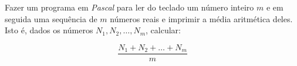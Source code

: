 \item Fazer um programa em \emph{Pascal} para ler do teclado
um número inteiro $m$ e em seguida
uma sequência de $m$ números reais e imprimir a média aritmética deles.
Isto é, dados os números $N_1, N_2, \ldots, N_m$, calcular:

\[
\frac{N_1 + N_2 + \ldots + N_m}{m}
\]